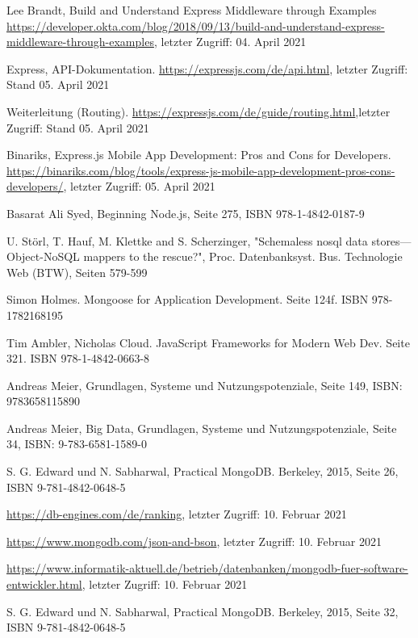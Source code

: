 \documentclass[11pt,a4paper]{article}
\begin{document}
\begin{itemize}
 Lee Brandt, Build and Understand Express Middleware through Examples \url{https://developer.okta.com/blog/2018/09/13/build-and-understand-express-middleware-through-examples}, letzter Zugriff: 04. April 2021

 Express, API-Dokumentation. \url{https://expressjs.com/de/api.html}, letzter Zugriff: Stand 05. April 2021

 Weiterleitung (Routing). \url{https://expressjs.com/de/guide/routing.html},letzter Zugriff: Stand 05. April 2021

 Binariks, Express.js Mobile App Development: Pros and Cons for Developers. \url{https://binariks.com/blog/tools/express-js-mobile-app-development-pros-cons-developers/}, letzter Zugriff: 05. April 2021

 Basarat Ali Syed, Beginning Node.js, Seite 275, ISBN 978-1-4842-0187-9

 U. Störl, T. Hauf, M. Klettke and S. Scherzinger, "Schemaless nosql data stores—Object-NoSQL mappers to the rescue?", Proc. Datenbanksyst. Bus. Technologie Web (BTW), Seiten 579-599


 Simon Holmes. Mongoose for Application Development. Seite 124f. ISBN 978-1782168195

 Tim Ambler, Nicholas Cloud. JavaScript Frameworks for Modern Web Dev. Seite 321. ISBN 978-1-4842-0663-8


%
%
%
%

 Andreas Meier, Grundlagen, Systeme und Nutzungspotenziale, Seite 149, ISBN: 9783658115890

 Andreas Meier, Big Data, Grundlagen, Systeme und Nutzungspotenziale, Seite 34, ISBN: 9-783-6581-1589-0

 S. G. Edward und N. Sabharwal, Practical MongoDB. Berkeley, 2015, Seite 26, ISBN 9-781-4842-0648-5

 \url{https://db-engines.com/de/ranking}, letzter Zugriff: 10. Februar 2021

 \url{https://www.mongodb.com/json-and-bson}, letzter Zugriff: 10. Februar 2021

 \url{https://www.informatik-aktuell.de/betrieb/datenbanken/mongodb-fuer-software-entwickler.html}, letzter Zugriff: 10. Februar 2021

 S. G. Edward und N. Sabharwal, Practical MongoDB. Berkeley, 2015, Seite 32, ISBN 9-781-4842-0648-5


\end{itemize}
\end{document}
